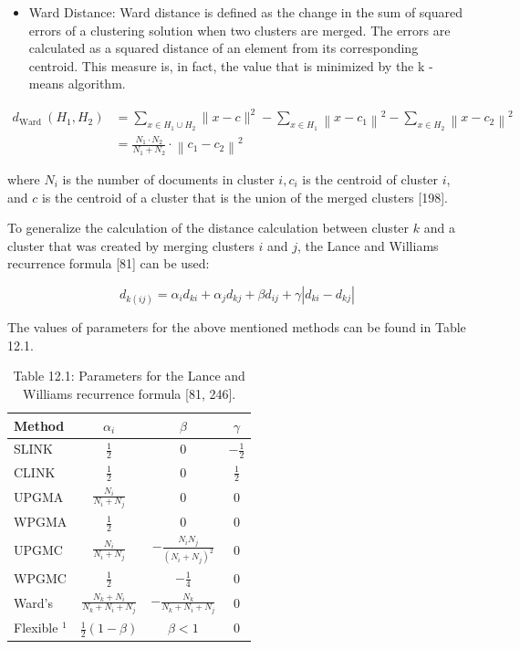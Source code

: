 \documentclass[10pt]{book}
\begin{document}
\begin{itemize}
  \item Ward Distance: Ward distance is defined as the change in the sum of squared errors of a clustering solution when two clusters are merged. The errors are calculated as a squared distance of an element from its corresponding centroid. This measure is, in fact, the value that is minimized by the k -means algorithm.
\end{itemize}


\begin{align*}
d_{\text {Ward }}\left(H_{1}, H_{2}\right) & =\sum_{x \in H_{1} \cup H_{2}}\|x-c\|^{2}-\sum_{x \in H_{1}}\left\|x-c_{1}\right\|^{2}-\sum_{x \in H_{2}}\left\|x-c_{2}\right\|^{2} \\
& =\frac{N_{1} \cdot N_{2}}{N_{1}+N_{2}} \cdot\left\|c_{1}-c_{2}\right\|^{2} \tag{12.35}
\end{align*}


where $N_{i}$ is the number of documents in cluster $i, c_{i}$ is the centroid of cluster $i$, and $c$ is the centroid of a cluster that is the union of the merged clusters [198].

To generalize the calculation of the distance calculation between cluster $k$ and a cluster that was created by merging clusters $i$ and $j$, the Lance and Williams recurrence formula [81] can be used:


\begin{equation*}
d_{k(i j)}=\alpha_{i} d_{k i}+\alpha_{j} d_{k j}+\beta d_{i j}+\gamma\left|d_{k i}-d_{k j}\right| \tag{12.36}
\end{equation*}


The values of parameters for the above mentioned methods can be found in Table 12.1.

\begin{table}[h]
\begin{center}
\captionsetup{labelformat=empty}
\caption{Table 12.1: Parameters for the Lance and Williams recurrence formula [81, 246].}
\begin{tabular}{lccc}
\hline
Method & $\alpha_{i}$ & $\beta$ & $\gamma$ \\
\hline
SLINK & $\frac{1}{2}$ & 0 & $-\frac{1}{2}$ \\
CLINK & $\frac{1}{2}$ & 0 & $\frac{1}{2}$ \\
UPGMA & $\frac{N_{i}}{N_{i}+N_{j}}$ & 0 & 0 \\
WPGMA & $\frac{1}{2}$ & 0 & 0 \\
UPGMC & $\frac{N_{i}}{N_{i}+N_{j}}$ & $-\frac{N_{i} N_{j}}{\left(N_{i}+N_{j}\right)^{2}}$ & 0 \\
WPGMC & $\frac{1}{2}$ & $-\frac{1}{4}$ & 0 \\
Ward's & $\frac{N_{k}+N_{i}}{N_{k}+N_{i}+N_{j}}$ & $-\frac{N_{k}}{N_{k}+N_{i}+N_{j}}$ & 0 \\
Flexible $^{1}$ & $\frac{1}{2}(1-\beta)$ & $\beta<1$ & 0 \\
\hline
\end{tabular}
\end{center}
\end{table}
\end{document}
